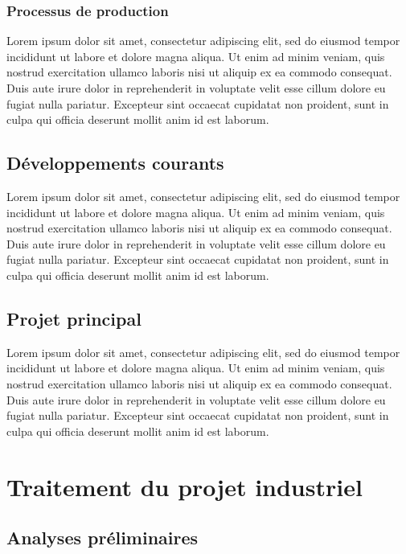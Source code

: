 \documentclass[a4paper, 12pt]{report}
\begin{document}
\subsection{Processus de production}

Lorem ipsum dolor sit amet, consectetur adipiscing elit, sed do eiusmod tempor incididunt ut labore et dolore magna aliqua. Ut enim ad minim veniam, quis nostrud exercitation ullamco laboris nisi ut aliquip ex ea commodo consequat. Duis aute irure dolor in reprehenderit in voluptate velit esse cillum dolore eu fugiat nulla pariatur. Excepteur sint occaecat cupidatat non proident, sunt in culpa qui officia deserunt mollit anim id est laborum.

\section{Développements courants}

Lorem ipsum dolor sit amet, consectetur adipiscing elit, sed do eiusmod tempor incididunt ut labore et dolore magna aliqua. Ut enim ad minim veniam, quis nostrud exercitation ullamco laboris nisi ut aliquip ex ea commodo consequat. Duis aute irure dolor in reprehenderit in voluptate velit esse cillum dolore eu fugiat nulla pariatur. Excepteur sint occaecat cupidatat non proident, sunt in culpa qui officia deserunt mollit anim id est laborum.

\section{Projet principal}

Lorem ipsum dolor sit amet, consectetur adipiscing elit, sed do eiusmod tempor incididunt ut labore et dolore magna aliqua. Ut enim ad minim veniam, quis nostrud exercitation ullamco laboris nisi ut aliquip ex ea commodo consequat. Duis aute irure dolor in reprehenderit in voluptate velit esse cillum dolore eu fugiat nulla pariatur. Excepteur sint occaecat cupidatat non proident, sunt in culpa qui officia deserunt mollit anim id est laborum.

\chapter{Traitement du projet industriel}

\section{Analyses préliminaires}
\end{document}
